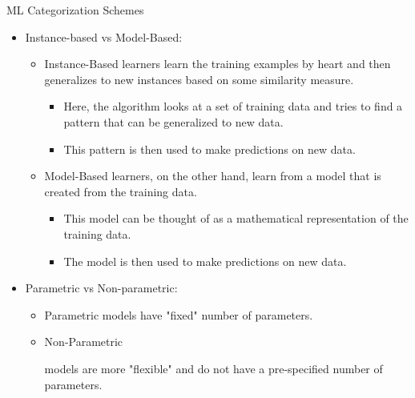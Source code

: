 \documentclass[compress,oilve]{beamer}
\newcommand{\tc}[2]{
	\textcolor{#1}{\hspace{-2pt}#2\hspace{-2pt}}
}
\begin{document}
\begin{frame}{ML Categorization Schemes}
	\begin{itemize}
		\item Instance-based vs Model-Based:
		\begin{itemize}
			\item \tc{keywords}{Instance-Based} learners learn the training examples by heart and then generalizes to new instances based on some similarity measure.
			
			\begin{itemize}
				\item Here, the algorithm looks at a set of training data and tries to find a pattern that can be generalized to new data.
				
				\item This pattern is then used to make predictions on new data.
			\end{itemize}
			
			\item \tc{keywords}{Model-Based} learners, on the other hand, learn from a model that is created from the training data.
			
			\begin{itemize}
				\item This model can be thought of as a mathematical representation of the training data.
				\item The model is then used to make predictions on new data.
			\end{itemize}
		\end{itemize}
		
		\medskip
		\item Parametric vs Non-parametric:
		
		\begin{itemize}
			\item \tc{keywords}{Parametric} models have "fixed" number of parameters.
			
			\item \tc{keywords}{Non-Parametric}
			models are more "flexible" and do not have a pre-specified number of parameters.
			
		\end{itemize}
		
		\medskip
	\end{itemize}
\end{frame}


\end{document}
